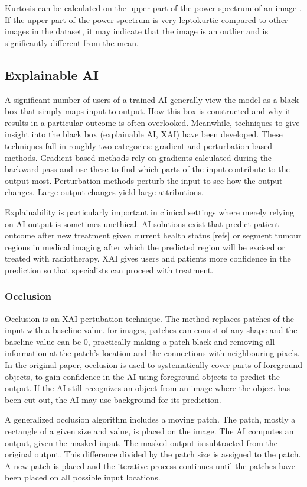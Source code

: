 Kurtosis can be calculated on the upper part of the power spectrum of an image .
If the upper part of the power spectrum is very leptokurtic compared to other images in the dataset, it may indicate that the image is an outlier and is significantly different from the mean.

\subsection{Explainable AI}
A significant number of users of a trained AI generally view the model as a black box that simply maps input to output.
How this box is constructed and why it results in a particular outcome is often overlooked.
Meanwhile, techniques to give insight into the black box (explainable AI, XAI) have been developed.
These techniques fall in roughly two categories: gradient and perturbation based methods.
Gradient based methods rely on gradients calculated during the backward pass and use these to find which parts of the input contribute to the output most.
Perturbation methods perturb the input to see how the output changes.
Large output changes yield large attributions.

Explainability is particularly important in clinical settings where merely relying on AI output is sometimes unethical.
AI solutions exist that predict patient outcome after new treatment given current health status [refs] or segment tumour regions in medical imaging after which the predicted region will be excised or treated with radiotherapy.
XAI gives users and patients more confidence in the prediction so that specialists can proceed with treatment.

\subsubsection{Occlusion}\label{subsec:occlusion}
Occlusion  is an XAI pertubation technique.
The method replaces patches of the input with a baseline value.
\eg for images, patches can consist of any shape and the baseline value can be 0, practically making a patch black and removing all information at the patch's location and the connections with neighbouring pixels.
In the original paper, occlusion is used to systematically cover parts of foreground objects, to gain confidence in the AI using foreground objects to predict the output.
If the AI still recognizes an object from an image where the object has been cut out, the AI may use background for its prediction.

A generalized occlusion algorithm includes a moving patch.
The patch, mostly a rectangle of a given size and value, is placed on the image.
The AI computes an output, given the masked input.
The masked output is subtracted from the original output.
This difference divided by the patch size is assigned to the patch.
A new patch is placed and the iterative process continues until the patches have been placed on all possible input locations.
